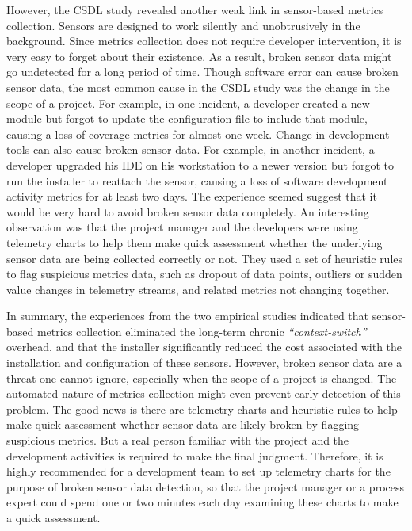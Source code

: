 However, the CSDL study revealed another weak link in sensor-based metrics collection. Sensors are designed to work silently and unobtrusively in the background. Since metrics collection does not require developer intervention, it is very easy to forget about their existence. As a result, broken sensor data might go undetected for a long period of time. Though software error can cause broken sensor data, the most common cause in the CSDL study was the change in the scope of a project. For example, in one incident, a developer created a new module but forgot to update the configuration file to include that module, causing a loss of coverage metrics for almost one week. Change in development tools can also cause broken sensor data. For example, in another incident, a developer upgraded his IDE on his workstation to a newer version but forgot to run the installer to reattach the sensor, causing a loss of software development activity metrics for at least two days. The experience seemed suggest that it would be very hard to avoid broken sensor data completely. An interesting observation was that the project manager and the developers were using telemetry charts to help them make quick assessment whether the underlying sensor data are being collected correctly or not. They used a set of heuristic rules to flag suspicious metrics data, such as dropout of data points, outliers or sudden value changes in telemetry streams, and related metrics not changing together. 

In summary, the experiences from the two empirical studies indicated that sensor-based metrics collection eliminated the long-term chronic \textit{``context-switch''} overhead, and that the installer significantly reduced the cost associated with the installation and configuration of these sensors. However, broken sensor data are a threat one cannot ignore, especially when the scope of a project is changed. The automated nature of metrics collection might even prevent early detection of this problem. The good news is there are telemetry charts and heuristic rules to help make quick assessment whether sensor data are likely broken by flagging suspicious metrics. But a real person familiar with the project and the development activities is required to make the final judgment. Therefore, it is highly recommended for a development team to set up telemetry charts for the purpose of broken sensor data detection, so that the project manager or a process expert could spend one or two minutes each day examining these charts to make a quick assessment.










